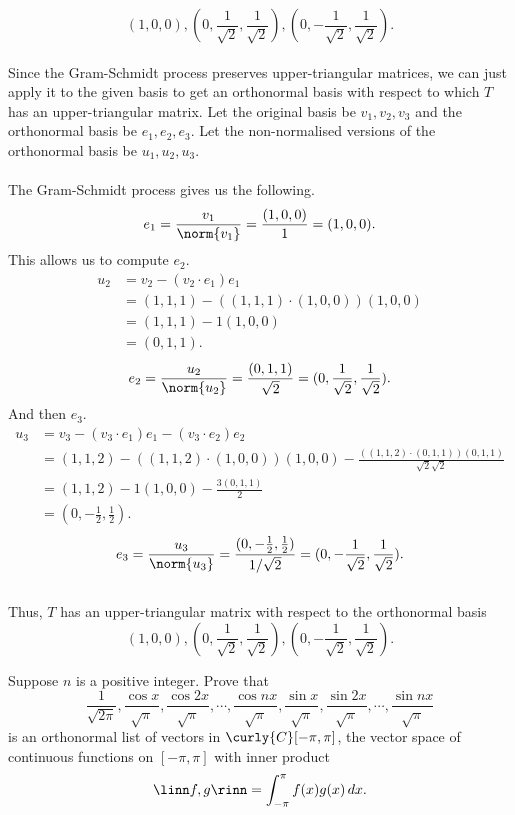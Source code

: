 \documentclass[12pt, letterpaper]{hmcpset}
\begin{document}
\begin{solution}
	\[
		\boxed{
			(1, 0, 0), (0, \frac{1}{\sqrt 2}, \frac{1}{\sqrt 2}), (0, -\frac{1}{\sqrt 2}, \frac{1}{\sqrt 2}).
		}
	\] \\
	Since the Gram-Schmidt process preserves upper-triangular matrices, we can just apply it to the given basis to get an orthonormal basis with respect to which $T$ has an upper-triangular matrix. Let the original basis be $v_1, v_2, v_3$ and the orthonormal basis be $e_1, e_2, e_3$. Let the non-normalised versions of the orthonormal basis be $u_1, u_2, u_3$.\\\\
	The Gram-Schmidt process gives us the following.
	\[
		e_1 = \frac{v_1}{\norm{v_1}} = \frac{(1, 0, 0)}{1} = (1, 0, 0).
	\]
	This allows us to compute $e_2$.
	\[
		\begin{split}
			u_2 & = v_2 - (v_2 \cdot e_1) e_1 \\
			    & = (1, 1, 1) - ((1, 1, 1) \cdot (1, 0, 0)) (1, 0, 0) \\
			    & = (1, 1, 1) - 1(1, 0, 0) \\ 
			    & = (0, 1, 1).
		\end{split}
	\]
	\[
		e_2 = \frac{u_2}{\norm{u_2}} = \frac{(0, 1, 1)}{\sqrt{2}} = (0, \frac{1}{\sqrt 2}, \frac{1}{\sqrt 2}).
	\]
	And then $e_3$.
	\[
		\begin{split}
			u_3 & = v_3 - (v_3 \cdot e_1)e_1 - (v_3 \cdot e_2)e_2 \\ 
			    & = (1, 1, 2) - ((1, 1, 2) \cdot (1, 0, 0))(1, 0, 0) - \frac{((1, 1, 2) \cdot (0, 1, 1))(0, 1, 1)}{\sqrt{2} \sqrt{2}} \\
			    & = (1, 1, 2) - 1(1, 0, 0) - \frac{3(0, 1, 1)}{2} \\
			    & = (0, -\frac{1}{2}, \frac{1}{2}).
		\end{split}
	\]
	\[
		e_3 = \frac{u_3}{\norm{u_3}} = \frac{(0, -\frac{1}{2}, \frac{1}{2})}{1 / \sqrt{2}} = (0, -\frac{1}{\sqrt 2}, \frac{1}{\sqrt 2}).
	\]\\
	Thus, $T$ has an upper-triangular matrix with respect to the orthonormal basis
	\[
		(1, 0, 0), (0, \frac{1}{\sqrt 2}, \frac{1}{\sqrt 2}), (0, -\frac{1}{\sqrt 2}, \frac{1}{\sqrt 2}).
	\]
\end{solution}

\pagebreak

\begin{problem}[4]
	Suppose $n$ is a positive integer. Prove that
	\[
		\frac{1}{\sqrt{2 \pi}}, \frac{\cos{x}}{\sqrt{\pi}}, \frac{\cos{2x}}{\sqrt{\pi}}, \cdots, \frac{\cos{nx}}{\sqrt{\pi}}, \frac{\sin{x}}{\sqrt{\pi}}, \frac{\sin{2x}}{\sqrt{\pi}}, \cdots, \frac{\sin{nx}}{\sqrt{\pi}}
	\]
	is an orthonormal list of vectors in $\curly{C}[-\pi, \pi]$, the vector space of continuous functions on $[-\pi, \pi]$ with inner product
	\[
		\linn f, g \rinn =  \int_{-\pi}^{\pi} f(x) g(x) \, dx.
	\]
\end{problem}
\end{document}
